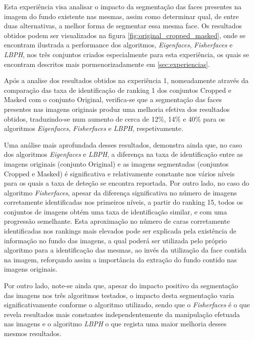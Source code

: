 Esta experiência visa analisar o impacto da segmentação das faces presentes na imagem do fundo existente nas mesmas, assim como determinar qual, de entre duas alternativas, a melhor forma de segmentar essa mesma face. Os resultados obtidos podem ser visualizados na figura \ref{fig:original_cropped_masked}, onde se encontram ilustrada a performance dos algoritmos, \textit{Eigenfaces}, \textit{Fisherfaces} e \textit{LBPH}, nos três conjuntos criados especialmente para esta experiência, os quais se encontram descritos mais pormenorizadamente em \ref{sec:experiencias}.

Após a analise dos resultados obtidos na experiência 1, nomeadamente através da comparação das taxa de identificação de ranking 1 dos conjuntos Cropped e Masked com o conjunto Original, verifica-se que a segmentação das faces presentes nas imagens originais produz uma melhoria efetiva dos resultados obtidos, traduzindo-se num aumento de cerca de 12\%, 14\% e 40\% para os algoritmos \textit{Eigenfaces}, \textit{Fisherfaces} e \textit{LBPH}, respetivamente.

Uma análise mais aprofundada desses resultados, demonstra ainda que, no caso dos algoritmos \textit{Eigenfaces} e \textit{LBPH}, a diferença na taxa de identificação entre as imagens originais (conjunto Original) e as imagens segmentadas (conjuntos Cropped e Masked) é significativa e relativamente constante nos vários níveis para os quais a taxa de deteção se encontra reportada. Por outro lado, no caso do algoritmo \textit{Fisherfaces}, apesar da diferença significativa no número de imagens corretamente identificadas nos primeiros níveis, a partir do ranking 15, todos os conjuntos de imagens obtém uma taxa de identificação similar, e com uma progressão semelhante. Esta aproximação no número de caras corretamente identificadas nos rankings mais elevados pode ser explicada pela existência de informação no fundo das imagens, a qual poderá ser utilizada pelo próprio algoritmo para a identificação das mesmas, ao invés da utilização da face contida na imagem, reforçando assim a importância da extração do fundo contido nas imagens originais.

Por outro lado, note-se ainda que, apesar do impacto positivo da segmentação das imagens nos três algoritmos testados, o impacto desta segmentação varia significativamente conforme o algoritmo utilizado, sendo que o \textit{Fisherfaces} é o que revela resultados mais constantes independentemente da manipulação efetuada nas imagens e o algoritmo \textit{LBPH} o que regista uma maior melhoria desses mesmos resultados.

